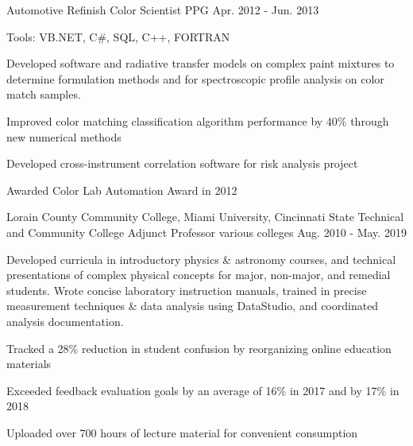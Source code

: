 \begin{cventries}
  \cvexpentry
    {Automotive Refinish} %
    {Color Scientist} %
    {PPG} %
    {Apr. 2012 - Jun. 2013}
    {
      \begin{cvheavyparagraph}
        Tools: VB.NET, C\#, SQL, C++, FORTRAN
      \end{cvheavyparagraph}
    }
    {
      \begin{cvparagraph}
        Developed software and radiative transfer models on complex paint mixtures to determine formulation methods and for spectroscopic profile analysis on color match samples.
      \end{cvparagraph}
      \begin{cvitems} %
        \item {Improved color matching classification algorithm performance by 40\% through new numerical methods}
        \item {Developed cross-instrument correlation software for risk analysis project}
        \item {Awarded Color Lab Automation Award in 2012}
      \end{cvitems}
    }

  \cventry
    {Lorain County Community College, Miami University, Cincinnati State Technical and Community College} %
    {Adjunct Professor} %
    {various colleges} %
    {Aug. 2010 - May. 2019} %
    {
      \begin{cvparagraph}
        Developed curricula in introductory physics \& astronomy courses, and technical presentations of complex physical concepts for major, non-major, and remedial students.  Wrote concise laboratory instruction manuals, trained in precise measurement techniques \& data analysis using DataStudio, and coordinated analysis documentation.
      \end{cvparagraph}
      \begin{cvitems} %
        \item {Tracked a 28\% reduction in student confusion by reorganizing online education materials}
        \item {Exceeded feedback evaluation goals by an average of 16\% in 2017 and by 17\% in 2018}
        \item {Uploaded over 700 hours of lecture material for convenient consumption}
      \end{cvitems}
    }


\end{cventries}
